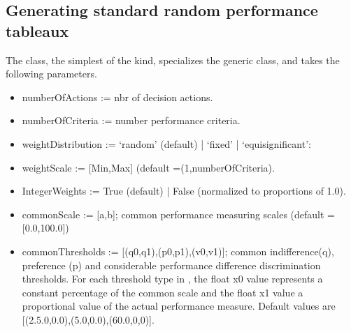 \documentclass[a4paper,12pt,english]{sphinxhowto}
\begin{document}
\subsection{Generating standard random performance tableaux}
\label{\detokenize{tutorial:generating-standard-random-performance-tableaux}}
The  class, the simplest of the kind, specializes the generic  class, and takes the following parameters.
\begin{itemize}
\item {} 
numberOfActions := nbr of decision actions.

\item {} 
numberOfCriteria := number performance criteria.

\item {} 
weightDistribution := ‘random’ (default) | ‘fixed’ | ‘equisignificant’:
\begin{quote}

\end{quote}

\item {} 
weightScale := {[}Min,Max{]} (default =(1,numberOfCriteria).

\item {} 
IntegerWeights := True (default) | False (normalized to proportions of 1.0).

\item {} 
commonScale := {[}a,b{]}; common performance measuring scales (default = {[}0.0,100.0{]})

\item {} 
commonThresholds := {[}(q0,q1),(p0,p1),(v0,v1){]}; common indifference(q), preference (p) and considerable performance difference discrimination thresholds. For each threshold type  in , the float x0 value represents a constant percentage of the common scale and the float x1 value a proportional value of the actual performance measure. Default values are {[}(2.5.0,0.0),(5.0,0.0),(60.0,0,0){]}.


\end{itemize}
\end{document}
